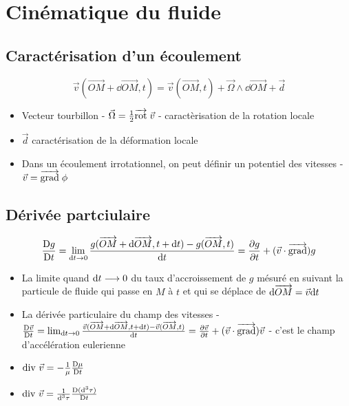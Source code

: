 \documentclass[openany]{book}
\begin{document}
\section{Cinématique du fluide}

\subsection{Caractérisation d'un écoulement}

\[ \vec{v}(\overrightarrow{OM} + \dd \overrightarrow{OM}, t) = \vec{v}(\overrightarrow{OM}, t) + \vec{\Omega}\wedge \dd \overrightarrow{OM} + \vec{d} \]

\begin{itemize}
    \item Vecteur tourbillon - $\vec{\Omega} = \frac{1}{2} \overrightarrow{\text{rot}} \; \vec{v}$ - caractèrisation de la rotation locale
    \item $\vec{d}$ caractérisation de la déformation locale
    \item Dans un écoulement irrotationnel, on peut définir un potentiel des vitesses - $\vec{v} = \overrightarrow{{\text{grad}}} \;\phi$
\end{itemize}

\subsection{Dérivée partciulaire}

\[ \frac{\text{D} g}{\text{D} t} = \lim_{\text{d}t \rightarrow 0} \frac{g(\overrightarrow{OM} + \text{d} \overrightarrow{OM}, t + \text{d}t) - g(\overrightarrow{OM}, t)}{\text{d}t} = \frac{\partial g}{\partial t} + (\vec{v}\cdot\overrightarrow{{\text{grad}}}) g \]

\begin{itemize}
    \item La limite quand $\text{d}t \longrightarrow 0$ du taux d'accroissement de $g$ mésuré en suivant la particule de fluide qui passe en $M$ à $t$ et qui se déplace de $\text{d} \overrightarrow{OM} = \vec{v} \text{d}t$
    \item La dérivée particulaire du champ des vitesses - $\frac{\text{D} \vec{v}}{\text{D} t} = \lim_{\text{d}t \rightarrow 0} \frac{\vec{v}(\overrightarrow{OM} + \text{d} \overrightarrow{OM}, t + \text{d}t) - \vec{v}(\overrightarrow{OM}, t)}{\text{d}t} = \frac{\partial \vec{v}}{\partial t} + (\vec{v}\cdot\overrightarrow{{\text{grad}}}) \vec{v}$ - c'est le champ d'accélération eulerienne
    \item $\text{div } \vec{v} = - \frac{1}{\mu} \frac{\text{D} \mu}{\text{D} t}$
    \item $\text{div } \vec{v} = \frac{1}{\text{d}^3 \tau} \frac{\text{D} (\text{d}^3 \tau)}{\text{D} t}$
\end{itemize}
\end{document}

